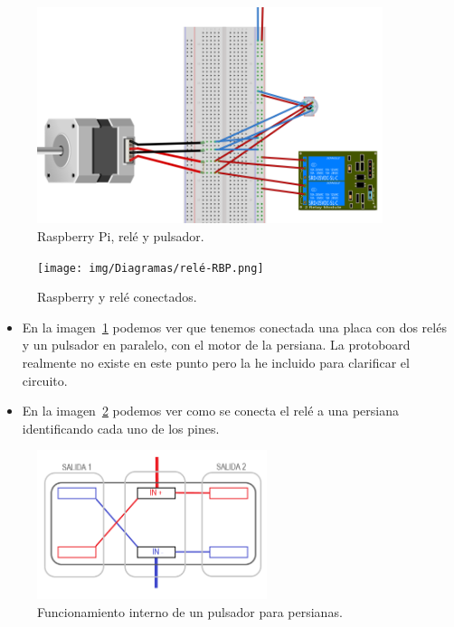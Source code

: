 \begin{figure}
    \centering
    \includegraphics[width=0.9\textwidth]{img/Diagramas/rele-pulsador-motor.png}
    \caption{Raspberry Pi, relé y pulsador.} \label{Img:Relé+Pulsador+Rbp_Fritzing}
\end{figure}
\begin{figure}
    \centering
    \texttt{[image: img/Diagramas/relé-RBP.png]}
    \caption{Raspberry y relé conectados.} \label{Img:Relé+Rbp_Fritzing}
\end{figure}

\begin{itemize}
    \item En la imagen~\ref{Img:Relé+Pulsador+Rbp_Fritzing} podemos ver que tenemos conectada una placa con dos relés y un pulsador en paralelo, con el motor de la persiana. La protoboard realmente no existe en este punto pero la he incluido para clarificar el circuito.
    \item En la imagen~\ref{Img:Relé+Rbp_Fritzing} podemos ver como se conecta el relé a una persiana identificando cada uno de los pines.
\end{itemize}

\begin{figure}
    \centering
    \includegraphics[width=0.6\textwidth]{img/Diagramas/PulsadorInterno.png}
    \caption{Funcionamiento interno de un pulsador para persianas.} \label{img:PulsadorInterno}
\end{figure}

